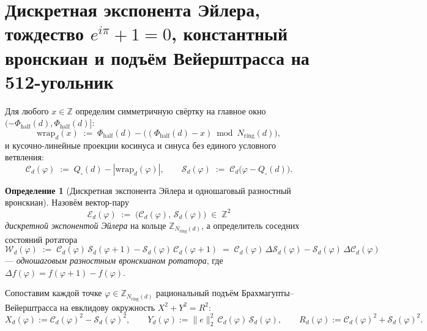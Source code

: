 \documentclass[11pt,a4paper]{article}
\theoremstyle{plain}
\theoremstyle{definition}
\newtheorem{definition}[theorem]{Определение}
\begin{document}
\section{Дискретная экспонента Эйлера, тождество \texorpdfstring{$e^{i\pi}+1=0$}{e\^{}(i pi)+1=0}, константный вронскиан и подъём Вейерштрасса на 512-угольник}
\label{sec:wronskian-euler}

Для любого $x\in\mathbb{Z}$ определим симметричную свёртку на главное окно $(-\Phi_{\mathrm{half}}(d),\Phi_{\mathrm{half}}(d)]$:
\begin{equation}
  \label{eq:wrap-ring}
  \mathrm{wrap}_d(x) \;:=\; \Phi_{\mathrm{half}}(d) - \bigl((\Phi_{\mathrm{half}}(d) - x) \bmod N_{\mathrm{ring}}(d)\bigr),
\end{equation}
и кусочно-линейные проекции косинуса и синуса без единого условного ветвления:
\begin{equation}
  \label{eq:proj-cs}
  \mathcal{C}_d(\varphi) \;:=\; Q_\square(d) - |\mathrm{wrap}_d(\varphi)|,\qquad
  \mathcal{S}_d(\varphi) \;:=\; \mathcal{C}_d\bigl(\varphi - Q_\square(d)\bigr).
\end{equation}

\begin{definition}[Дискретная экспонента Эйлера и одношаговый разностный вронскиан]
\label{def:euler-exp-wronskian}
Назовём вектор-пару
\[
  \mathcal{E}_d(\varphi) \;:=\; \bigl(\mathcal{C}_d(\varphi),\,\mathcal{S}_d(\varphi)\bigr) \;\in\; \mathbb{Z}^2
\]
\emph{дискретной экспонентой Эйлера} на кольце $\mathbb{Z}_{N_{\mathrm{ring}}(d)}$, а определитель соседних состояний ротатора
\begin{equation}
  \label{eq:rotator-wronskian}
  \mathcal{W}_d(\varphi) \;:=\; \mathcal{C}_d(\varphi)\,\mathcal{S}_d(\varphi+1) - \mathcal{S}_d(\varphi)\,\mathcal{C}_d(\varphi+1)
  \;=\; \mathcal{C}_d(\varphi)\,\Delta\mathcal{S}_d(\varphi) - \mathcal{S}_d(\varphi)\,\Delta\mathcal{C}_d(\varphi)
\end{equation}
--- \emph{одношаговым разностным вронскианом ротатора}, где $\Delta f(\varphi) = f(\varphi+1)-f(\varphi)$.
\end{definition}

Сопоставим каждой точке $\varphi\in\mathbb{Z}_{N_{\mathrm{ring}}(d)}$ рациональный подъём Брахмагупты--Вейерштрасса на евклидову окружность $X^2+Y^2=R^2$:
\begin{equation}
  \label{eq:weierstrass-lift}
  X_d(\varphi) := \mathcal{C}_d(\varphi)^2 - \mathcal{S}_d(\varphi)^2,\qquad
  Y_d(\varphi) := \|e\|_2^2\,\mathcal{C}_d(\varphi)\,\mathcal{S}_d(\varphi),\qquad
  R_d(\varphi) := \mathcal{C}_d(\varphi)^2 + \mathcal{S}_d(\varphi)^2.
\end{equation}
\end{document}
